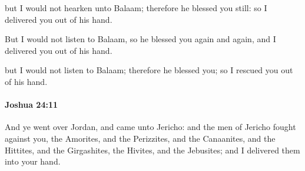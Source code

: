 			\begin{versebox}
					\item[BHS] 
					\item[ASV] but I would not hearken unto Balaam; therefore he blessed you still: so I delivered you out of his hand.
					\item[NIV] But I would not listen to Balaam, so he blessed you again and again, and I delivered you out of his hand.
					\item[NRSV] but I would not listen to Balaam; therefore he blessed you; so I rescued you out of his hand.
			\end{versebox}

		\paragraph{Joshua 24:11} %
			\label{JOSHUA-24-11}

			And ye went over Jordan, and came unto Jericho: and the men of Jericho fought against you, the Amorites, and the Perizzites, and the Canaanites, and the Hittites, and the Girgashites, the Hivites, and the Jebusites; and I delivered them into your hand.

